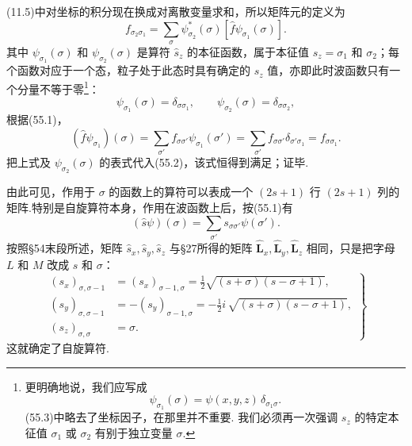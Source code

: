 (11.5)中对坐标的积分现在换成对离散变量求和，所以矩阵元的定义为
\begin{equation}
  f_{\sigma_2\sigma_1}=\sum_{\sigma}\psi^*_{\sigma_2}(\sigma)[\hat{f}\psi_{\sigma_1}(\sigma)].
\end{equation}
其中 $\psi_{\sigma_1}(\sigma)$ 和 $\psi_{\sigma_2}(\sigma)$ 是算符 $\hat{s}_z$ 的本征函数，属于本征值 $s_z=\sigma_1$ 和 $\sigma_2$；每个函数对应于一个态，粒子处于此态时具有确定的 $s_z$ 值，亦即此时波函数只有一个分量不等于零\footnote{更明确地说，我们应写成
\begin{equation*}
  \psi_{\sigma_1}(\sigma)=\psi(x,y,z)\,\delta_{\sigma_1\sigma}.
\end{equation*}
(55.3)中略去了坐标因子，在那里并不重要.
我们必须再一次强调 $s_z$ 的特定本征值 $\sigma_1$ 或 $\sigma_2$ 有别于独立变量 $\sigma$.}：
\begin{equation}
  \psi_{\sigma_1}(\sigma)=\delta_{\sigma\sigma_1},\qquad
  \psi_{\sigma_2}(\sigma)=\delta_{\sigma\sigma_2},
\end{equation}
根据(55.1)，
\begin{equation*}
  (\hat{f}\psi_{\sigma_1})(\sigma)=\sum_{\sigma'}f_{\sigma\sigma'}\psi_{\sigma_1}(\sigma')
  =\sum_{\sigma'}f_{\sigma\sigma'}\delta_{\sigma'\sigma_1}=f_{\sigma\sigma_1}.
\end{equation*}
把上式及 $\psi_{\sigma_2}(\sigma)$ 的表式代入(55.2)，该式恒得到满足；证毕.

由此可见，作用于 $\sigma$ 的函数上的算符可以表成一个 $(2s+1)$ 行 $(2s+1)$ 列的矩阵.特别是自旋算符本身，作用在波函数上后，按(55.1)有
\begin{equation}
  (\hat{s}\psi)(\sigma)=\sum_{\sigma'}s_{\sigma\sigma'}\psi(\sigma').
\end{equation}
按照§54末段所述，矩阵 $\hat{s}_x,\hat{s}_y,\hat{s}_z$ 与§27所得的矩阵 $\hat{\boldsymbol{L}}_x,\hat{\boldsymbol{L}}_y,\hat{\boldsymbol{L}}_z$ 相同，只是把字母 $L$ 和 $M$ 改成 $s$ 和 $\sigma$：
\begin{equation}
\left.\begin{aligned}
  (s_x)_{\sigma,\sigma-1}&=(s_x)_{\sigma-1,\sigma}
  =\frac{1}{2}\sqrt{(s+\sigma)(s-\sigma+1)},\\
  (s_y)_{\sigma,\sigma-1}&=-(s_y)_{\sigma-1,\sigma}
  =-\frac{1}{2}i\,\sqrt{(s+\sigma)(s-\sigma+1)},\\
  (s_z)_{\sigma,\sigma}&=\sigma.
\end{aligned}\right\}
\end{equation}
这就确定了自旋算符.

